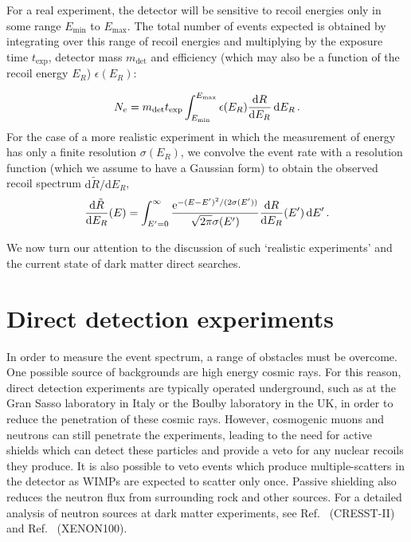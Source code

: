 For a real experiment, the detector will be sensitive to recoil energies only in some range $E_\textrm{min}$ to $E_\textrm{max}$. The total number of events expected is obtained by integrating over this range of recoil energies and multiplying by the exposure time $t_\textrm{exp}$, detector mass $m_\textrm{det}$ and efficiency (which may also be a function of the recoil energy $E_R$) $\epsilon(E_R)$:

\begin{equation}
N_e = m_\textrm{det} t_\textrm{exp} \int_{E_\textrm{min}}^{E_\textrm{max}}\epsilon(E_R) \frac{\mathrm{d}R}{\mathrm{d}E_R} \, \mathrm{d}E_R\,.
\end{equation}
For the case of a more realistic experiment in which the measurement of energy has only a finite resolution $\sigma(E_R)$, we convolve the event rate with a resolution function (which we assume to have a Gaussian form) to obtain the observed recoil spectrum $\mathrm{d}\tilde{R}/\mathrm{d}E_R$,
\begin{equation}
\frac{\mathrm{d}\tilde{R}}{\mathrm{d}E_R}(E) = \int_{E' = 0}^{\infty} \frac{\mathrm{e}^{-(E - E')^2/(2\sigma(E'))}}{\sqrt{2\pi}\sigma(E')} \frac{\mathrm{d}R}{\mathrm{d}E_R}(E') \, \mathrm{d}E'\,.
\end{equation} 

We now turn our attention to the discussion of such `realistic experiments' and the current state of dark matter direct searches. 



\section{Direct detection experiments}




In order to measure the event spectrum, a range of obstacles must be overcome. One possible source of backgrounds are high energy cosmic rays. For this reason, direct detection experiments are typically operated underground, such as at the Gran Sasso laboratory in Italy or the Boulby laboratory in the UK, in order to reduce the penetration of these cosmic rays. However, cosmogenic muons and neutrons can still penetrate the experiments, leading to the need for active shields which can detect these particles and provide a veto for any nuclear recoils they produce. It is also possible to veto events which produce multiple-scatters in the detector as WIMPs are expected to scatter only once. Passive shielding also reduces the neutron flux from surrounding rock and other sources. For a detailed analysis of neutron sources at dark matter experiments, see Ref.~\cite{Scholl:2012} (CRESST-II) and Ref.~\cite{Aprile:2013b} (XENON100).

